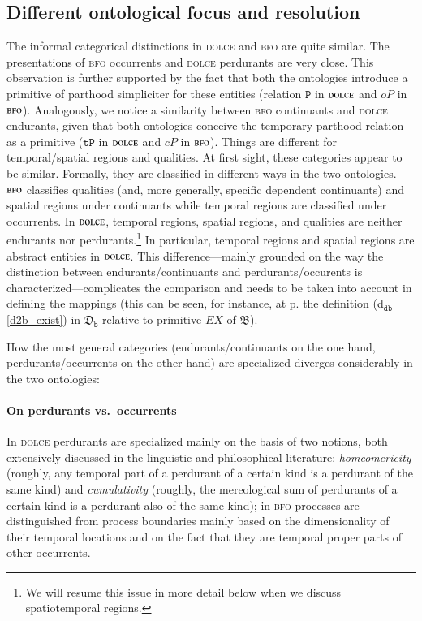\documentclass[ao]{iosart2x}
\newcommand{\dbDefLabel}{\textrm{d$_\texttt{db}$}}
\newcommand{\refdbdf}[1]{({\dbDefLabel}\ref{#1})}
\newcommand{\pr}[1]{\mathtt{#1}}
\newcommand{\prbfo}[1]{{\textit{{#1}}}}
\newcommand{\dolce}{{\textsc{dolce}}}
\newcommand{\bfo}{{\textsc{bfo}}}
\newcommand {\thbfo} {\ensuremath{\mathfrak{B}}}
\newcommand {\thdolcedbmap} {\ensuremath{\mathfrak{D}_\texttt{b}}}
\newcommand {\TPd} {\ensuremath{\pr{tP}}}
\newcommand {\Pd} {\ensuremath{\pr{P}}}
\newcommand{\bfocpart}{\prbfo{cP}}
\newcommand{\bfoopart}{\prbfo{oP}}
\newcommand{\bfoexist}{\prbfo{EX}}
\begin{document}
\subsection{Different ontological focus and resolution}\label{sect_diff_resolution}

The informal categorical distinctions in {\dolce} and {\bfo} are quite similar. The presentations of {\bfo} occurrents and {\dolce} perdurants are very close. This observation is further supported by the fact that both the ontologies introduce a primitive of parthood simpliciter for these entities (relation $\Pd$ in {$\dolce$} and $\bfoopart$ in {$\bfo$}). 
Analogously, we notice a similarity between {\bfo} continuants and {\dolce} endurants, given that both ontologies conceive the temporary parthood relation as a primitive ($\TPd$ in {$\dolce$} and $\bfocpart$ in {$\bfo$}).
Things are different for temporal/spatial  regions and qualities. At first sight, these categories appear to be similar. Formally, they are classified in different ways in the two ontologies. 
{$\bfo$} classifies qualities (and, more generally, specific dependent continuants) and spatial regions under continuants while temporal regions are classified under occurrents. In {$\dolce$}, temporal regions, spatial regions, and qualities are neither endurants nor perdurants.\footnote{We will resume this issue in more detail below when we discuss spatiotemporal regions.} In particular, temporal regions and spatial regions are abstract entities in {$\dolce$}. This difference---mainly grounded on the way the distinction between endurants/continuants  and perdurants/occurents is characterized---complicates the comparison and needs to be taken into account in defining the mappings (this can be seen, for instance, at p.\pageref{d2b_exist} the definition \refdbdf{d2b_exist} in $\thdolcedbmap$ relative to primitive $\bfoexist$ of {$\thbfo$}).      

How the most general categories (endurants/continuants on the one hand, perdurants/occurrents on the other hand) are specialized diverges considerably in the two ontologies:

\paragraph{On perdurants vs.~occurrents} In {\dolce} perdurants are specialized mainly on the basis of two notions, both extensively discussed in the linguistic and philosophical literature: \emph{homeomericity} (roughly, any temporal part of a perdurant of a certain kind is a perdurant of the same kind) and \emph{cumulativity} (roughly, the mereological sum of perdurants of a certain kind is a perdurant also of the same kind); in {\bfo} processes are distinguished from process boundaries mainly based on the dimensionality of their temporal locations and on the fact that they are temporal proper parts of other occurrents.
\end{document}
